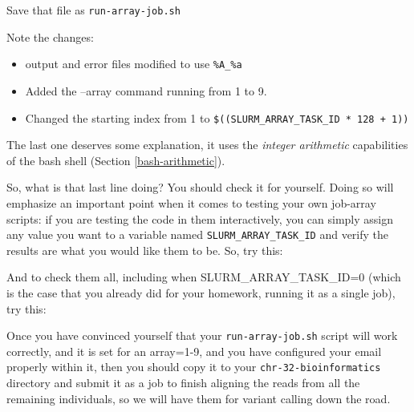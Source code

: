 \documentclass[]{krantz}
\makeatletter
\newenvironment{Shaded}{\begin{snugshade}}{\end{snugshade}}
\newcommand{\BuiltInTok}[1]{#1}
\newcommand{\DataTypeTok}[1]{\textcolor[rgb]{0.27,0.27,0.27}{#1}}
\newcommand{\ExtensionTok}[1]{#1}
\newcommand{\KeywordTok}[1]{\textcolor[rgb]{0.27,0.27,0.27}{\textbf{#1}}}
\newcommand{\NormalTok}[1]{#1}
\newcommand{\VariableTok}[1]{\textcolor[rgb]{0,0,0}{#1}}
\providecommand{\tightlist}{%
  \setlength{\itemsep}{0pt}\setlength{\parskip}{0pt}}
\newenvironment{kframe}{%
\medskip{}
\setlength{\fboxsep}{.8em}
 \def\at@end@of@kframe{}%
 \ifinner\ifhmode%
  \def\at@end@of@kframe{\end{minipage}}%
  \begin{minipage}{\columnwidth}%
 \fi\fi%
 \def\FrameCommand##1{\hskip\@totalleftmargin \hskip-\fboxsep
 \colorbox{shadecolor}{##1}\hskip-\fboxsep
     \hskip-\linewidth \hskip-\@totalleftmargin \hskip\columnwidth}%
 \MakeFramed {\advance\hsize-\width
   \@totalleftmargin\z@ \linewidth\hsize
   \@setminipage}}%
 {\par\unskip\endMakeFramed%
 \at@end@of@kframe}
\renewenvironment{Shaded}{\begin{kframe}}{\end{kframe}}
\makeatother
\begin{document}
Save that file as \texttt{run-array-job.sh}

Note the changes:

\begin{itemize}
\tightlist
\item
  output and error files modified to use \texttt{\%A\_\%a}
\item
  Added the --array command running from 1 to 9.
\item
  Changed the starting index from 1 to \texttt{\$((SLURM\_ARRAY\_TASK\_ID\ *\ 128\ +\ 1))}
\end{itemize}

The last one deserves some explanation, it uses the \emph{integer arithmetic}
capabilities of the bash shell (Section \ref{bash-arithmetic}).

So, what is that last line doing? You should check it for yourself. Doing so
will emphasize an important point when it comes to testing your own job-array scripts:
if you are testing the code in them interactively, you can simply assign any value you
want to a variable named \texttt{SLURM\_ARRAY\_TASK\_ID} and verify the results are what you would
like them to be. So, try this:

\begin{Shaded}
\end{Shaded}

And to check them all, including when SLURM\_ARRAY\_TASK\_ID=0 (which is the case that
you already did for your homework, running it as a single job), try this:

\begin{Shaded}
\end{Shaded}

Once you have convinced yourself that your \texttt{run-array-job.sh} script will
work correctly, and it is set for an array=1-9, and you have configured
your email properly within it, then you should copy it to your
\texttt{chr-32-bioinformatics} directory and submit it as a job to finish aligning
the reads from all the remaining individuals, so we will have them for
variant calling down the road.
\end{document}
